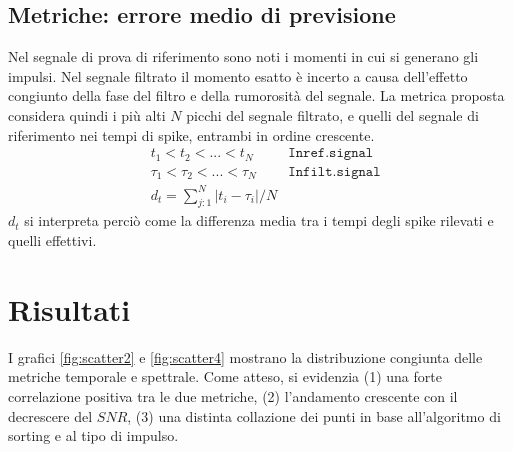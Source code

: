\documentclass[9pt,twocolumn,twoside]{osajnl}
\begin{document}
\subsection{Metriche: errore medio di previsione}
\label{metricaT}

Nel segnale di prova di riferimento sono noti i momenti in cui si generano gli impulsi.
Nel segnale filtrato il momento esatto è incerto a causa dell'effetto congiunto della fase del filtro e della rumorosità del segnale. La metrica proposta considera quindi i più alti $N$ picchi del segnale filtrato, e quelli del segnale di riferimento nei tempi di spike, entrambi in ordine crescente.
%
\begin{align*}
 & t_{1} < t_{2} < ... < t_{N} & \mathtt{In ref. signal}\\
 & \tau_{1} < \tau_{2} < ... < \tau_{N} & \mathtt{In filt. signal}\\
 & d_{t} = \sum_{j:1}^{N} |t_{i} - \tau_{i}| / N
 \end{align*}
%
$d_{t}$ si interpreta perciò come la differenza media tra i tempi degli spike rilevati e quelli effettivi. 




\section{Risultati}
\label{risultati}

I grafici \ref{fig:scatter2} e \ref{fig:scatter4} mostrano la distribuzione congiunta delle metriche temporale e spettrale. Come atteso, si evidenzia (1) una forte correlazione positiva tra le due metriche, (2) l'andamento crescente con il decrescere del $SNR$, (3) una distinta collazione dei punti in base all'algoritmo di sorting e al tipo di impulso.


\end{document}
